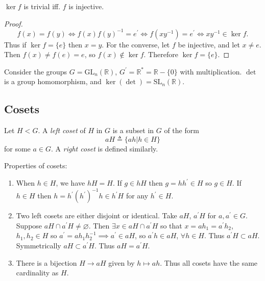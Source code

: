 \begin{prop}
$\ker f$ is trivial iff. $f$ is injective.
\end{prop}
\begin{proof}
$$
f(x) = f(y) \iff f(x) f(y)^{-1} = e^\prime
            \iff f(xy^{-1}) = e^\prime
            \iff xy^{-1} \in \ker f.
$$
Thus if $\ker f = \{ e \}$ then $x = y$. For the converse, let $f$ be
injective, and let $x \neq e$. Then $f(x) \neq f(e) = e$, so
$f(x) \notin \ker f$. Therefore $\ker f = \{ e \}$.
\end{proof}

\begin{xmpl}
Consider the groups
$G = \mathrm{GL}_n (\mathbb{R})$,
$G^\prime = \mathbb{R}^\ast = \mathbb{R} - \{0\}$ with multiplication.
$\det$ is a group homomorphism, and
$\ker(\det) = \mathrm{SL}_n(\mathbb{R})$.
\end{xmpl}

\subsection{Cosets}

\begin{defn}[Coset]
Let $H < G$. A \emph{left coset} of $H$ in $G$ is a subset in $G$ of the form
$$
aH \triangleq \{ ah | h \in H \}
$$
for some $a \in G$. A \emph{right coset} is defined similarly.
\end{defn}

\begin{remark}

Properties of cosets:
\begin{enumerate}
  \item{When $h \in H$, we have $hH = H$. If $g \in hH$ then
        $g = h h^\prime \in H$ so $g \in H$. If $h \in H$ then
        $h = h^\prime (h^\prime)^{-1} h \in h^\prime H$ for any
        $h^\prime \in H$.
       }
  \item{Two left cosets are either disjoint or identical. Take $aH$,
        $a^\prime H$ for $a, a^\prime \in G$. Suppose
        $aH \cap a^\prime H \neq \varnothing$. Then
        $\exists x \in aH \cap a^\prime H$ so that
        $x = ah_1 = a^\prime h_2$, $h_1, h_2 \in H$ so
        $a^\prime = a h_1 h_2^{-1} \implies a^\prime \in aH$,
        so $a^\prime h \in aH$, $\forall h \in H$. Thus
        $a^\prime H \subset aH$. Symmetrically
        $aH \subset a^\prime H$.
        Thus $aH = a^\prime H$.
       }
  \item{ There is a bijection $H \to aH$ given by $h \mapsto ah$. Thus
         all cosets have the same cardinality as $H$.
       }
\end{enumerate}

\end{remark}

